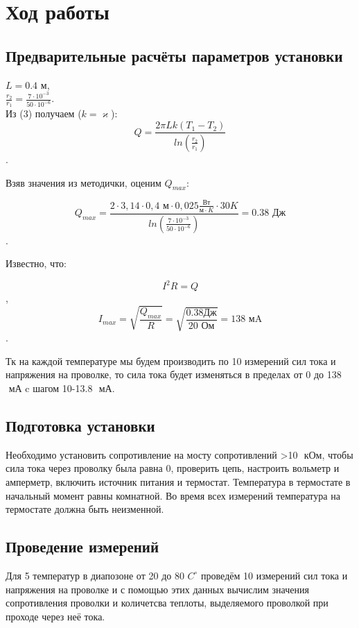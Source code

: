 \documentclass[a4paper]{article}
\begin{document}
\section{Ход работы}

\subsection{Предварительные расчёты параметров установки}

$L = 0.4 \text{ м}$, \\

$\frac{r_2}{r_1} = \frac{7 \cdot 10^{-3}}{50 \cdot 10^{-6}}$. \\

Из (3) получаем ($k=\varkappa$):\\

\[Q = \frac{2\pi L k (T_1 - T_2)}{ln(\frac{r_2}{r_1})}\].

Взяв значения из методички, оценим $Q_{max}$:

\[Q_{max} = \frac{2\cdot3,14 \cdot 0,4 \text{ м} \cdot 0,025 \frac{\text{Вт}}{\text{м} \cdot K} \cdot 30 K}{ln(\frac{7 \cdot 10^{-3}}{50 \cdot 10^{-6}})} = 0.38 \text{ Дж} \].

Известно, что:

\[I^2R = Q\],
\[I_{max} = \sqrt{\frac{Q_{max}}{R}} = \sqrt{\frac{0.38 \text{Дж}}{20 \text{ Ом}}} = 138 \text{ мA}\].

Тк на каждой температуре мы будем производить по 10 измерений сил тока и напряжения на проволке, то сила тока будет изменяться в пределах от 0 до 138 $\text{ мА}$ c шагом  10-13.8 $\text{ мА}$. \\

\subsection{Подготовка установки}

Необходимо установить сопротивление на мосту сопротивлений >10 $\text{ кОм}$, чтобы сила тока через проволку была равна 0, проверить цепь, настроить вольметр и амперметр, включить источник питания и термостат. Температура в термостате в начальный момент равны комнатной. Во время всех измерений температура на термостате должна быть неизменной.

\subsection{Проведение измерений}

Для 5 температур в диапозоне от 20 до 80 $C^\circ$ проведём 10 измерений сил тока и напряжения на проволке и с помощью этих данных вычислим значения сопротивления проволки и количетсва теплоты, выделяемого проволкой при проходе через неё тока. \\
\end{document}
